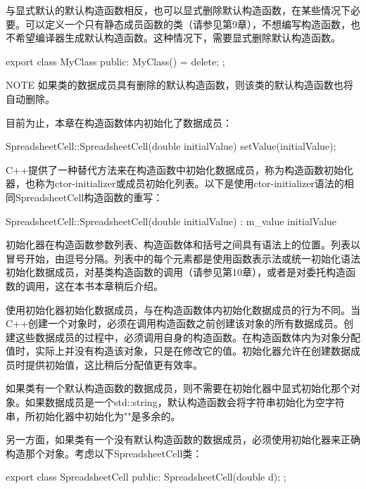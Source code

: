 与显式默认的默认构造函数相反，也可以显式删除默认构造函数，在某些情况下必要。可以定义一个只有静态成员函数的类（请参见第9章），不想编写构造函数，也不希望编译器生成默认构造函数。这种情况下，需要显式删除默认构造函数。

\begin{cpp}
export class MyClass
{
    public:
        MyClass() = delete;
};
\end{cpp}

\begin{myNotic}{NOTE}
如果类的数据成员具有删除的默认构造函数，则该类的默认构造函数也将自动删除。
\end{myNotic}


目前为止，本章在构造函数体内初始化了数据成员：

\begin{cpp}
SpreadsheetCell::SpreadsheetCell(double initialValue)
{
    setValue(initialValue);
}
\end{cpp}

C++提供了一种替代方法来在构造函数中初始化数据成员，称为构造函数初始化器，也称为ctor-initializer或成员初始化列表。以下是使用ctor-initializer语法的相同SpreadsheetCell构造函数的重写：

\begin{cpp}
SpreadsheetCell::SpreadsheetCell(double initialValue)
: m_value { initialValue }
{}
\end{cpp}

初始化器在构造函数参数列表、构造函数体和括号之间具有语法上的位置。列表以冒号开始，由逗号分隔。列表中的每个元素都是使用函数表示法或统一初始化语法初始化数据成员，对基类构造函数的调用（请参见第10章），或者是对委托构造函数的调用，这在本书本章稍后介绍。

使用初始化器初始化数据成员，与在构造函数体内初始化数据成员的行为不同。当C++创建一个对象时，必须在调用构造函数之前创建该对象的所有数据成员。创建这些数据成员的过程中，必须调用自身的构造函数。在构造函数体内为对象分配值时，实际上并没有构造该对象，只是在修改它的值。初始化器允许在创建数据成员时提供初始值，这比稍后分配值更有效率。

如果类有一个默认构造函数的数据成员，则不需要在初始化器中显式初始化那个对象。如果数据成员是一个std::string，默认构造函数会将字符串初始化为空字符串，所初始化器中初始化为""是多余的。

另一方面，如果类有一个没有默认构造函数的数据成员，必须使用初始化器来正确构造那个对象。考虑以下SpreadsheetCell类：

\begin{cpp}
export class SpreadsheetCell
{
    public:
        SpreadsheetCell(double d);
};
\end{cpp}

